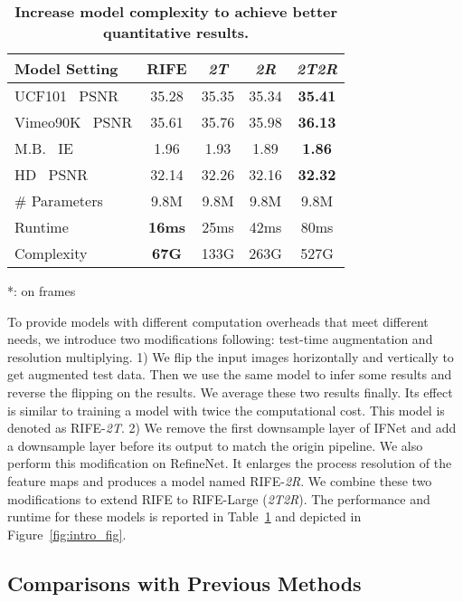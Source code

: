 \documentclass[final]{cvpr}
\def\red#1{\textcolor{MyRed}{#1}}
\def\first#1{\red{\textbf{#1}}}
\begin{document}
\begin{table}[t]
	\caption{\textbf{Increase model complexity to achieve better quantitative results.} }\label{tab:large}
	\centering
	\begin{tabular}{lcccc}
		\hline
		Model Setting  & RIFE & \textit{2T} & \textit{2R} & \textit{2T2R} \\ \hline
		UCF101~\cite{soomro2012ucf101} PSNR & 35.28 & 35.35 & 35.34 & \first{35.41} \\
		Vimeo90K~\cite{xue2019video} PSNR& 35.61 & 35.76 & 35.98 & \first{36.13}\\ M.B.~\cite{baker2011database} IE & 1.96 & 1.93    & 1.89 & \first{1.86}
		\\
		HD~\cite{bao2019depth} PSNR& 32.14 & 32.26 & 32.16 & \first{32.32} \\ 

		\# Parameters & 9.8M & 9.8M & 9.8M & 9.8M\\ Runtime & \first{16ms} & 25ms & 42ms & 80ms\\
		
		Complexity & \first{67G} & 133G & 263G & 527G\\
		\hline
	\end{tabular}
	\normalsize
	\begin{tablenotes}
		\raggedleft
		\item{
			*: on  frames
		}
	\end{tablenotes}
\end{table}

To provide models with different computation overheads that meet different needs, we introduce two modifications following: test-time augmentation and resolution multiplying. 1) We flip the input images horizontally and vertically to get augmented test data. Then we use the same model to infer some results and reverse the flipping on the results. We average these two results finally. Its effect is similar to training a model with twice the computational cost. This model is denoted as RIFE-\textit{2T}. 2) We remove the first downsample layer of IFNet and add a downsample layer before its output to match the origin pipeline. We also perform this modification on RefineNet. It enlarges the process resolution of the feature maps and produces a model named RIFE-\textit{2R}. We combine these two modifications to extend RIFE to RIFE-Large (\textit{2T2R}). The performance and runtime for these models is reported in Table~\ref{tab:large} and depicted in Figure~\ref{fig:intro_fig}. 

\subsection{Comparisons with Previous Methods}
\label{sec:comparison}
\end{document}
